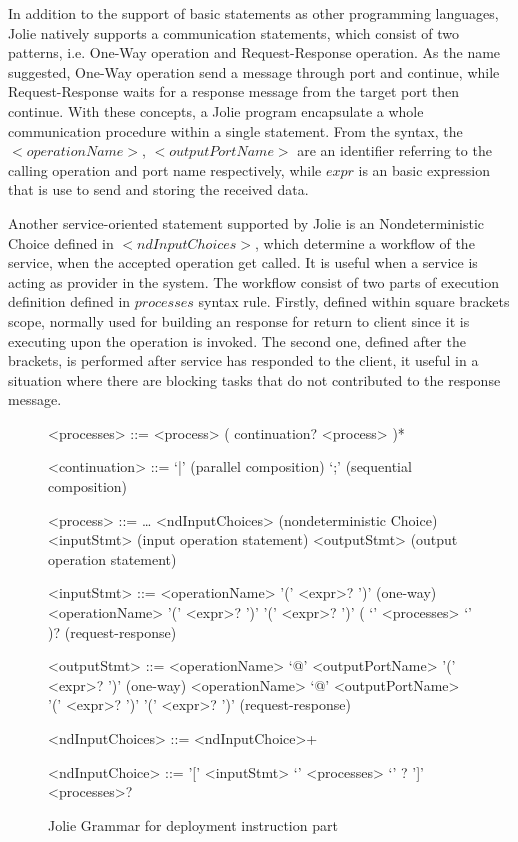 In addition to the support of basic statements as other programming languages, Jolie natively supports a communication statements, which consist of two patterns, i.e. One-Way operation and Request-Response operation. As the name suggested, One-Way operation send a message through port and continue, while Request-Response waits for a response message from the target port then continue. With these concepts, a Jolie program encapsulate a whole communication procedure within a single statement. From the syntax, the \(<operationName>\), \(<outputPortName>\) are an identifier referring to the calling operation and port name respectively, while \(expr\) is an basic expression that is use to send and storing the received data.

Another service-oriented statement supported by Jolie is an Nondeterministic Choice defined in \(<ndInputChoices>\), which determine a workflow of the service, when the accepted operation get called. It is useful when a service is acting as provider in the system. The workflow consist of two parts of execution definition defined in \(processes\) syntax rule. Firstly, defined within square brackets scope, normally used for building an response for return to client since it is executing upon the operation is invoked. The second one, defined after the brackets, is performed after service has responded to the client, it useful in a situation where there are blocking tasks that do not contributed to the response message.

\begin{figure}[h]
    \begin{framed}
        \begin{grammar}
            <processes>
            ::= <process> ( continuation? <process> )*

            <continuation> ::= `|' \hfill (parallel composition)
            \alt `;' \hfill (sequential composition)

            <process> ::= \dots
            \alt <ndInputChoices> \hfill (nondeterministic Choice)
            \alt <inputStmt> \hfill (input operation statement)
            \alt <outputStmt> \hfill (output operation statement)

            <inputStmt>
            ::= <operationName> '(' <expr>? ')' \hfill (one-way)
            \alt
            <operationName> '(' <expr>? ')' '(' <expr>? ')' ( `{' <processes> `}' )? \hfill (request-response)

            <outputStmt>
            ::= <operationName> `@' <outputPortName> '(' <expr>? ')' \hfill (one-way)
            \alt
            <operationName> `@' <outputPortName> '(' <expr>? ')' '(' <expr>? ')' \hfill (request-response)

            <ndInputChoices>
            ::= <ndInputChoice>+

            <ndInputChoice>
            ::= '[' <inputStmt> `{' <processes> `}' ? ']' <processes>?
        \end{grammar}
    \end{framed}
    \caption{Jolie Grammar for deployment instruction part}
    \label{fig:jolie-process}
\end{figure}

